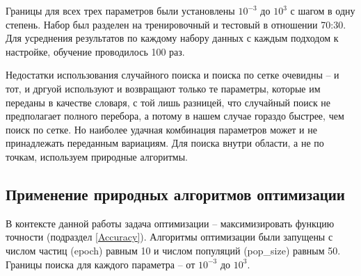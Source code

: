 Границы для всех трех параметров были установлены $10^{-3}$ до $10^3$ с шагом в одну степень.
Набор был разделен на тренировочный и тестовый в отношении 70:30. Для усреднения результатов по
каждому набору данных с каждым подходом к настройке, обучение проводилось 100 раз.

Недостатки использования случайного поиска и поиска по сетке очевидны -- и тот, и дргуой используют и возвращают только те
параметры, которые им переданы в качестве словаря, с той лишь разницей, что случайный поиск не предполагает полного перебора,
а потому в нашем случае гораздо быстрее, чем поиск по сетке.
Но наиболее удачная комбинация параметров может и не принадлежать переданным вариациям. Для поиска внутри области,
а не по точкам, используем природные алгоритмы.

\subsection{Применение природных алгоритмов оптимизации}

В контексте данной работы задача оптимизации -- максимизировать функцию точности (подраздел \ref{Accuracy}).
Алгоритмы оптимизации были запущены с числом частиц (epoch) равным 10 и числом популяций (pop\_size) равным 50.
Границы поиска для каждого параметра -- от $10^{-3}$ до $10^3$.




